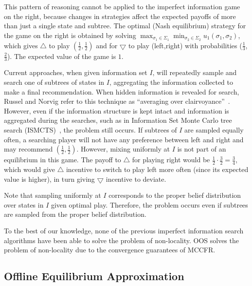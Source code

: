\documentclass{aamas2015}
\begin{document}
This pattern of reasoning cannot be applied to the imperfect information game on the right, because changes in strategies affect the expected payoffs of more 
than just a single state and subtree.
The optimal (Nash equilibrium) strategy for the game on the right is obtained by solving $\max_{\sigma_1 \in \Sigma_1} \min_{\sigma_2 \in \Sigma_2} u_1(\sigma_1, \sigma_2)$, which gives $\bigtriangleup$ to play $(\frac{1}{2},\frac{1}{2})$ and for $\bigtriangledown$ to play (left,right) with probabilities ($\frac{1}{3}$,$\frac{2}{3}$). The expected value of the game is $1$.

Current approaches, when given information set $I$, will repeatedly sample and search one of subtrees of states in $I$, aggregating the information collected to make a final recommendation. When hidden information is revealed for search, Russel and Norvig refer to this technique as ``averaging over clairvoyance''~\cite{russellnorvig}. However, even if the information structure is kept intact and information is aggregated during the searches, such as in Information Set Monte Carlo tree search (ISMCTS)~\cite{Cowling12ISMCTS}, the problem still occurs. If subtrees of $I$ are sampled equally often, a searching player will not have any preference between left and right and may recommend $(\frac{1}{2},\frac{1}{2})$. However, mixing uniformly at $I$ is not part of an equilibrium in this game. The payoff to $\bigtriangleup$ for playing right would be $\frac{1}{2} \cdot \frac{3}{2} = \frac{3}{4}$, which would give $\bigtriangleup$ incentive to switch to play left more often (since its expected value is higher), in turn giving $\bigtriangledown$ incentive to deviate. 

Note that sampling uniformly at $I$ corresponds to the proper belief distribution over states in $I$ given optimal play. Therefore, the problem occurs even if subtrees are sampled from the proper belief distribution. 

To the best of our knowledge, none of the previous imperfect information search algorithms have been able to solve the problem of non-locality. OOS solves the problem of non-locality due to the convergence guarantees of MCCFR. 

\subsection{Offline Equilibrium Approximation}
\end{document}
